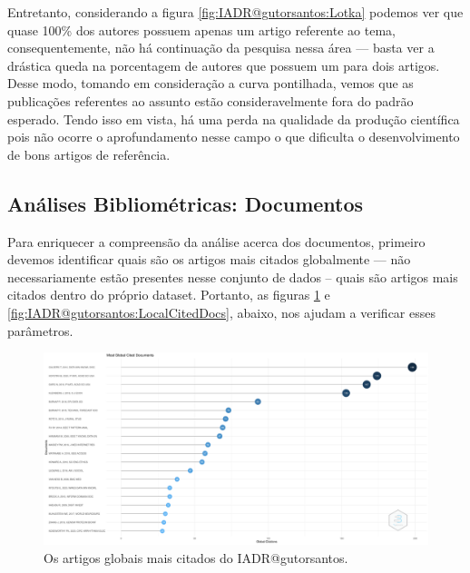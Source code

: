 Entretanto, considerando a figura \ref{fig:IADR@gutorsantos:Lotka} podemos ver que quase 100\% dos autores possuem apenas um artigo referente ao tema, consequentemente, não há continuação da pesquisa nessa área --- basta ver a drástica queda na porcentagem de autores que possuem um para dois artigos. Desse modo, tomando em consideração a curva pontilhada, vemos que as publicações referentes ao assunto estão consideravelmente fora do padrão esperado. Tendo isso em vista, há uma perda na qualidade da produção científica pois não ocorre o aprofundamento nesse campo o que dificulta o desenvolvimento de bons artigos de referência.


\subsection{Análises Bibliométricas: Documentos}

Para enriquecer a compreensão da análise acerca dos documentos, primeiro devemos identificar quais são os artigos mais citados globalmente --- não necessariamente estão presentes nesse conjunto de dados -- quais são artigos mais citados dentro do próprio dataset. Portanto, as figuras \ref{fig:IADR@gutorsantos:GlobalCitedDocs} e \ref{fig:IADR@gutorsantos:LocalCitedDocs}, abaixo, nos ajudam a verificar esses parâmetros.

\begin{figure}[H]
    \centering
    \includegraphics[angle=0,width=1\textwidth]{experiments/gutorsantos/AnaliseBibliometrica/IAeDiscriminacao/imgs/MostGlobalCitedDocuments-2022-02-09.png}
    \caption{Os artigos globais mais citados do IADR@gutorsantos.}
    \label{fig:IADR@gutorsantos:GlobalCitedDocs}
\end{figure}

